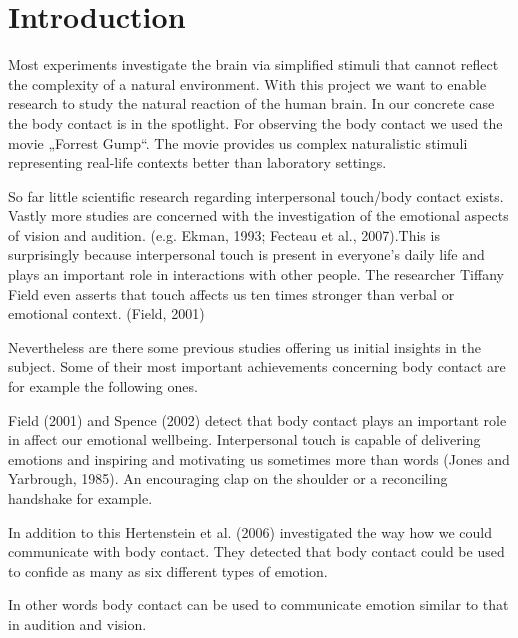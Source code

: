 \documentclass[10pt,a4paper]{article}
\begin{document}

\section*{Introduction}


Most experiments investigate the brain via simplified stimuli that cannot
reflect the complexity of a natural environment. With this project we want to
enable research to study the natural reaction of the human brain. In our
concrete case the body contact is in the spotlight. For observing the body
contact we used the movie „Forrest Gump“. The movie provides us complex
naturalistic stimuli representing real-life contexts better than laboratory
settings.

So far little scientific research regarding interpersonal touch/body contact
exists. Vastly more studies are concerned with the investigation of the
emotional aspects of vision and audition. (e.g. Ekman, 1993; Fecteau et al.,
2007).This is surprisingly because interpersonal touch is present in everyone's
daily life and plays an important role in interactions with other people. The
researcher Tiffany Field even asserts that touch affects us ten times stronger
than verbal or emotional context. (Field, 2001)  

Nevertheless are there some previous studies offering  us initial insights in
the subject.  Some of their  most important achievements concerning body
contact are for example the following ones.

Field (2001) and Spence (2002) detect that body contact plays an important role
in affect our emotional wellbeing. Interpersonal touch is capable of delivering
emotions and inspiring and motivating us sometimes more than words (Jones and
Yarbrough, 1985). An encouraging clap on the shoulder or a reconciling
handshake for example. 

In addition to this Hertenstein et al. (2006) investigated the way how we could
communicate with body contact. They detected that body contact could be used to
confide as many as six different types of emotion.

In other words body contact can be used to communicate emotion similar to that
in audition and vision.
\end{document}
